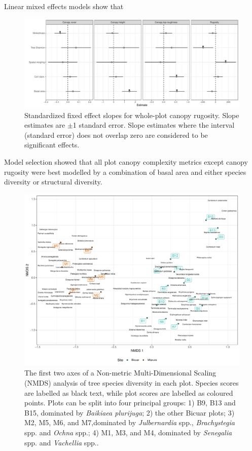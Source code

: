 \documentclass[11pt,a4paper]{article}
\begin{document}
Linear mixed effects models show that 

\begin{figure}[H]
\centering
	\includegraphics[width=\textwidth]{canopy_rough_slopes}
	\caption{Standardized fixed effect slopes for whole-plot canopy rugosity. Slope estimates are $\pm$1 standard error. Slope estimates where the interval (standard error) does not overlap zero are considered to be significant effects.}
	\label{canopy_rough_slopes}
\end{figure}

Model selection showed that all plot canopy complexity metrics except canopy rugosity were best modelled by a combination of basal area and either species diversity or structural diversity. 



\begin{figure}[H]
\centering
	\includegraphics[width=\textwidth]{nmds}
	\caption{The first two axes of a Non-metric Multi-Dimensional Scaling (NMDS) analysis of tree species diversity in each plot. Species scores are labelled as black text, while plot scores are labelled as coloured points. Plots can be split into four principal groups: 1) B9, B13 and B15, dominated by \textit{Baikiaea plurijuga}; 2) the other Bicuar plots; 3) M2, M5, M6, and M7,dominated by \textit{Julbernardia} spp., \textit{Brachystegia} spp. and \textit{Ochna} spp.; 4) M1, M3, and M4, dominated by \textit{Senegalia} spp. and \textit{Vachellia} spp..}
	\label{nmds}
\end{figure}
\end{document}
